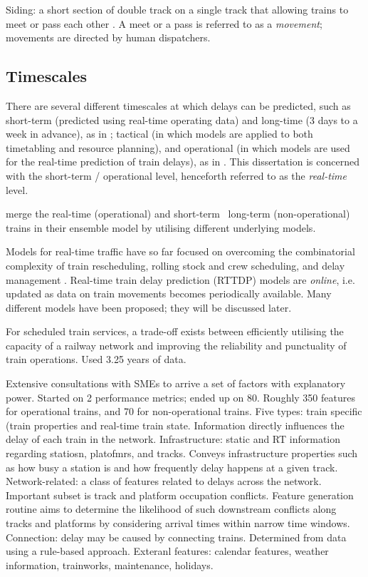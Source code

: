 \documentclass{article}
\begin{document}
Siding: a short section of double track on a single track that allowing trains to meet or pass each other \cite{barbour_et_al_2019}. A meet or a pass is referred to as a \textit{movement}; movements are directed by human dispatchers. 

\subsection{Timescales}

There are several different timescales at which delays can be predicted, such as short-term (predicted using real-time operating data) and long-time (3 days to a week in advance), as in \cite{wang_zhang_2019};
tactical (in which models are applied to both timetabling and resource planning), and operational (in which models are used for the real-time prediction of train delays), as in \cite{markovic_milinkovic_tikhonov_schonfeld_2015}. This dissertation is concerned with the short-term / operational level, henceforth referred to as the \textit{real-time} level. 

\cite{nair_et_al_2019} merge the real-time (operational) and short-term \ long-term (non-operational) trains in their ensemble model by utilising different underlying models.

Models for real-time traffic have so far focused on overcoming the combinatorial complexity of train rescheduling, rolling stock and crew scheduling, and delay management \cite{kecman_corman_meng_2015}.
Real-time train delay prediction (RTTDP) models are \textit{online}, i.e. updated as data on train movements becomes periodically available.  Many different models have been proposed; they will be discussed later.

For scheduled train services, a trade-off exists between efficiently utilising the capacity of a railway network and improving the reliability and punctuality of train operations. Used 3.25 years of data. 

Extensive consultations with SMEs to arrive a set of factors with explanatory power. Started on 2 performance metrics; ended up on 80. Roughly 350 features for operational trains, and 70 for non-operational trains. Five types: train specific (train properties and real-time train state. Information directly influences the delay of each train in the network.
Infrastructure: static and RT information regarding statiosn, platofmrs, and tracks. Conveys infrastructure properties such as how busy a station is and how frequently delay happens at a given track.
Network-related: a class of features related to delays across the network. Important subset is track and platform occupation conflicts. Feature generation routine aims to determine the likelihood of such downstream 
conflicts along tracks and platforms by considering arrival times within narrow time windows. 
Connection: delay may be caused by connecting trains. Determined from data using a rule-based approach.
Exteranl features: calendar features, weather information, trainworks, maintenance, holidays.
\end{document}
